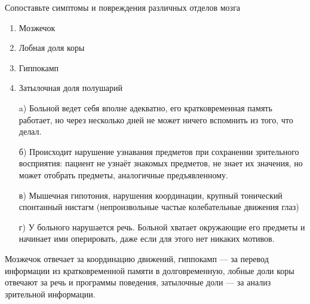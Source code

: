 
Сопоставьте симптомы и повреждения различных отделов мозга

\begin{enumerate}
    \item Мозжечок
    \item Лобная доля коры
    \item Гиппокамп
    \item Затылочная доля полушарий
\end{enumerate}

\begin{enumerate}
    \item[a)] Больной ведет себя вполне адекватно, его кратковременная память работает, но через несколько дней не может ничего вспомнить из того, что делал.
    \item[б)] Происходит нарушение узнавания предметов при сохранении зрительного восприятия: пациент не узнаёт знакомых предметов, не знает их значения, но может отобрать предметы, аналогичные предъявленному.
    \item[в)] Мышечная гипотония, нарушения координации, крупный тонический спонтанный нистагм (непроизвольные частые колебательные движения глаз)
    \item[г)] У больного нарушается речь. Больной хватает окружающие его предметы и начинает ими оперировать, даже если для этого нет никаких мотивов.
\end{enumerate}

\commentsSection

Мозжечок отвечает за координацию движений, гиппокамп — за перевод информации из кратковременной памяти в долговременную, лобные доли коры отвечают за речь и программы поведения, затылочные доли — за анализ зрительной информации.

